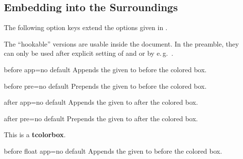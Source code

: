 \clearpage
\subsection{Embedding into the Surroundings}
The following option keys extend the options given in .

\begin{marker}
The \enquote{hookable} versions are usable inside the document.
In the preamble, they can only be used after explicit setting of
 and  or by e.\,g.\ .
\end{marker}

\begin{docTcbKey}{before app}{=}{no default}
  Appends the given  to  before the colored box.
\end{docTcbKey}

\begin{docTcbKey}{before pre}{=}{no default}
  Prepends the given  to  before the colored box.
\end{docTcbKey}

\begin{docTcbKey}{after app}{=}{no default}
  Appends the given  to  after the colored box.
\end{docTcbKey}

\begin{docTcbKey}{after pre}{=}{no default}
  Prepends the given  to  after the colored box.
\end{docTcbKey}

\begin{dispExample}

\begin{tcolorbox}[title=My title,before app={The box follows:\\[4pt]},
  after app={This is the end.}]
This is a \textbf{tcolorbox}.
\end{tcolorbox}
\end{dispExample}

\medskip

\begin{docTcbKey}{before float app}{=}{no default}
  Appends the given  to  before the colored box.
\end{docTcbKey}

